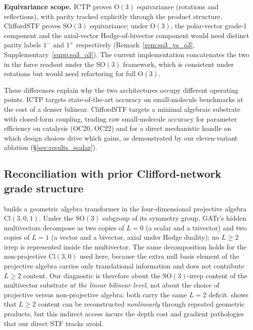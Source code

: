 \textbf{Equivariance scope.} ICTP proves $\mathrm{O}(3)$ equivariance (rotations and reflections), with parity tracked explicitly through the product structure. CliffordSTF proves $\mathrm{SO}(3)$ equivariance; under $\mathrm{O}(3)$, the polar-vector grade-1 component and the axial-vector Hodge-of-bivector component would need distinct parity labels $1^-$ and $1^+$ respectively (Remark~\ref{rem:so3_vs_o3}, Supplementary~\ref{supp:so3_o3}). The current implementation concatenates the two in the force readout under the $\mathrm{SO}(3)$ framework, which is consistent under rotations but would need refactoring for full $\mathrm{O}(3)$.

These differences explain why the two architectures occupy different operating points. ICTP targets state-of-the-art accuracy on small-molecule benchmarks at the cost of a denser bilinear. CliffordSTF targets a minimal algebraic substrate with closed-form coupling, trading raw small-molecule accuracy for parameter efficiency on catalysis (OC20, OC22) and for a direct mechanistic handle on which design choices drive which gains, as demonstrated by our eleven-variant ablation (\S\ref{sec:results_scalar}).

\subsection{Reconciliation with prior Clifford-network grade structure}\label{supp:gatr}

\citet{brehmer2023geometric} builds a geometric algebra transformer in the four-dimensional projective algebra $\mathrm{Cl}(3,0,1)$. Under the $\mathrm{SO}(3)$ subgroup of its symmetry group, GATr's hidden multivectors decompose as two copies of $L{=}0$ (a scalar and a trivector) and two copies of $L{=}1$ (a vector and a bivector, axial under Hodge duality); no $L \geq 2$ irrep is represented inside the multivector. The same decomposition holds for the non-projective $\mathrm{Cl}(3,0)$ used here, because the extra null basis element of the projective algebra carries only translational information and does not contribute $L \geq 2$ content. Our diagnostic is therefore about the $\mathrm{SO}(3)$-irrep content of the multivector substrate \emph{at the linear bilinear level}, not about the choice of projective versus non-projective algebra: both carry the same $L{=}2$ deficit. \citet{ruhe2023cgenn} shows that $L \geq 2$ content can be reconstructed \emph{nonlinearly} through repeated geometric products, but this indirect access incurs the depth cost and gradient pathologies that our direct STF tracks avoid.

